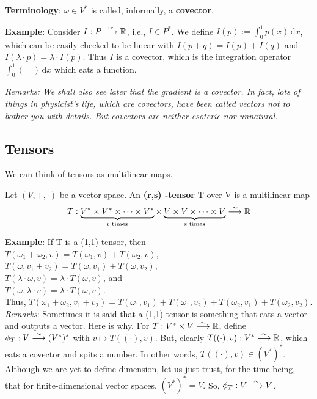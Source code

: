 \textbf{Terminology}: $\omega \in V^{\ast}$ is called, informally, a \textbf{covector}.

\textbf{Example}: Consider $I : P \stackrel{\sim}{\longrightarrow} \mathbb{R}$, i.e., $I \in P^\ast$. We define $I(p) := \int_0^1 \! p(x) \, \mathrm{d}x$, which can be easily checked to be linear with $I(p + q) = I(p) + I(q)$ and $I(\lambda \cdot p) = \lambda \cdot I(p)$. Thus $I$ is a covector, which is the integration operator $\int_0^1 \! ( \quad ) \, \mathrm{d}x$ which eats a function. 

\textit{Remarks: We shall also see later that the gradient is a covector. In fact, lots of things in physicist's life, which are covectors, have been called vectors not to bother you with details. But covectors are neither esoteric nor unnatural.}

\subsection{Tensors}
We can think of tensors as multilinear maps.

\begin{definition}
Let $(V, +, \cdot)$ be a vector space. An \textbf{(r,s) -tensor} T over V is a multilinear map
\begin{equation*}
T : \underbrace{V^\ast \times V^\ast \times \dots \times V^\ast}_\text{r times} \times \underbrace{V \times V \times \dots \times V}_\text{s times} \stackrel{\sim}{\longrightarrow} \mathbb{R}
\end{equation*}
\end{definition}

\textbf{Example}: If T is a (1,1)-tensor, then \\
$T(\omega_1 + \omega_2, v) = T(\omega_1, v) + T(\omega_2, v)$, \\
$T(\omega, v_1 + v_2) = T(\omega, v_1) + T(\omega, v_2)$, \\
$T(\lambda \cdot \omega, v) = \lambda \cdot T(\omega, v)$, and \\
$T(\omega, \lambda \cdot v) = \lambda \cdot T(\omega, v)$. \\
Thus, $T(\omega_1 + \omega_2, v_1 + v_2) = T(\omega_1, v_1) + T(\omega_1, v_2) + T(\omega_2, v_1) + T(\omega_2, v_2)$. \\

\textit{Remarks}: Sometimes it is said that a (1,1)-tensor is something that eats a vector and outputs a vector. Here is why. For $T : V^\ast \times V \stackrel{\sim}{\longrightarrow} \mathbb{R}$, define $\phi_T : V \stackrel{\sim}{\longrightarrow} (V^\ast)^\ast$ with $v \mapsto T(( \cdot ), v)$. But, clearly $T(( \cdot ), v) : V^\ast \stackrel{\sim}{\longrightarrow} \mathbb{R}$, which eats a covector and spits a number. In other words, $T(( \cdot ), v) \in (V^\ast)^\ast$. Although we are yet to define dimension, let us just trust, for the time being, that for finite-dimensional vector spaces, $(V^\ast)^\ast = V$. So, $\phi_T : V \stackrel{\sim}{\longrightarrow} V$.

